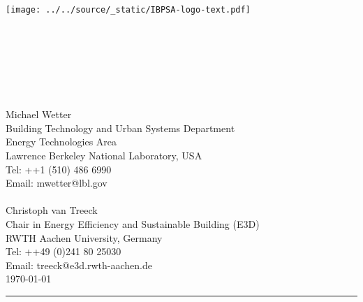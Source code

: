 \begin{titlepage}
\begin{minipage}{\headwidth}
\hspace*{12.1cm}\texttt{[image: ../../source/\_static/IBPSA-logo-text.pdf]}
\begin{flushright}
\vspace{-1cm}
\large{~}
\\[5mm]
\hrulefill
\\[5mm]
 \Large{}\\
 \Large{}\\
\Large{}\\[3mm]
\hrulefill
~\\[20mm]
\large{Michael Wetter\\
Building Technology and Urban Systems Department\\
Energy Technologies Area\\
Lawrence Berkeley National Laboratory, USA\\
Tel: ++1 (510) 486 6990\\
Email: mwetter@lbl.gov\\
~\\
Christoph van Treeck\\
Chair in Energy Efficiency and Sustainable Building (E3D)\\
RWTH Aachen University, Germany\\
Tel: ++49 (0)241 80 25030\\
Email: treeck@e3d.rwth-aachen.de}\\[20mm]
\large{\today}
\\[20mm]
\end{flushright}
\hrule
~\\[2mm]
\end{minipage}
\end{titlepage}
